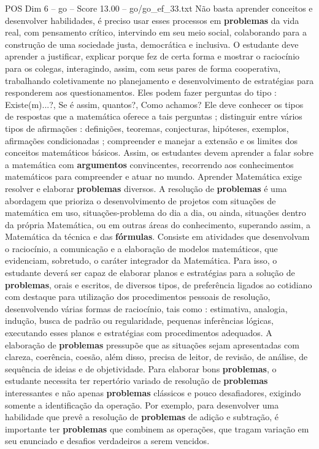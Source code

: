 \begin{textsample}{POS Dim 6 – go – Score 13.00 – go/go\_ef\_33.txt}
Não basta aprender conceitos e desenvolver habilidades, é preciso usar esses processos em \textbf{problemas} da vida real, com pensamento crítico, intervindo em seu meio social, colaborando para a construção de uma sociedade justa, democrática e inclusiva.
O estudante deve aprender a justificar, explicar porque fez de certa forma e mostrar o raciocínio para os colegas, interagindo, assim, com seus pares de forma cooperativa, trabalhando coletivamente no planejamento e desenvolvimento de estratégias para responderem aos questionamentos.
Eles podem fazer perguntas do tipo : Existe(m)...?, Se é assim, quantos?, Como achamos?
Ele deve conhecer os tipos de respostas que a matemática oferece a tais perguntas ; distinguir entre vários tipos de afirmações : definições, teoremas, conjecturas, hipóteses, exemplos, afirmações condicionadas ; compreender e manejar a extensão e os limites dos conceitos matemáticos básicos.
Assim, os estudantes devem aprender a falar sobre a matemática com \textbf{argumentos} convincentes, recorrendo aos conhecimentos matemáticos para compreender e atuar no mundo.
Aprender Matemática exige resolver e elaborar \textbf{problemas} diversos.
A resolução de \textbf{problemas} é uma abordagem que prioriza o desenvolvimento de projetos com situações de matemática em uso, situações-problema do dia a dia, ou ainda, situações dentro da própria Matemática, ou em outras áreas do conhecimento, superando assim, a Matemática da técnica e das \textbf{fórmulas}.
Consiste em atividades que desenvolvam o raciocínio, a comunicação e a elaboração de modelos matemáticos, que evidenciam, sobretudo, o caráter integrador da Matemática.
Para isso, o estudante deverá ser capaz de elaborar planos e estratégias para a solução de \textbf{problemas}, orais e escritos, de diversos tipos, de preferência ligados ao cotidiano com destaque para utilização dos procedimentos pessoais de resolução, desenvolvendo várias formas de raciocínio, tais como : estimativa, analogia, indução, busca de padrão ou regularidade, pequenas inferências lógicas, executando esses planos e estratégias com procedimentos adequados.
A elaboração de \textbf{problemas} pressupõe que as situações sejam apresentadas com clareza, coerência, coesão, além disso, precisa de leitor, de revisão, de análise, de sequência de ideias e de objetividade.
Para elaborar bons \textbf{problemas}, o estudante necessita ter repertório variado de resolução de \textbf{problemas} interessantes e não apenas \textbf{problemas} clássicos e pouco desafiadores, exigindo somente a identificação da operação.
Por exemplo, para desenvolver uma habilidade que prevê a resolução de \textbf{problemas} de adição e subtração, é importante ter \textbf{problemas} que combinem as operações, que tragam variação em seu enunciado e desafios verdadeiros a serem vencidos.

\end{textsample}
